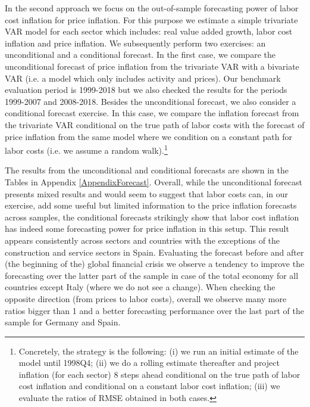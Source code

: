 \documentclass[11pt]{article}
\begin{document}
In the second approach we focus on the out-of-sample forecasting power of labor cost inflation for price inflation. For this purpose we estimate a simple trivariate VAR model for each sector which includes: real value added growth, labor cost inflation and price inflation. We subsequently perform two exercises: an unconditional and a conditional forecast. In the first case, we compare the unconditional forecast of price inflation from the trivariate VAR with a bivariate VAR (i.e. a model which only includes activity and prices). Our benchmark evaluation period is 1999-2018 but we also checked the results for the periods 1999-2007 and 2008-2018.  Besides the unconditional forecast, we also consider a conditional forecast exercise. In this case, we compare the inflation forecast from the trivariate VAR conditional on the true path of labor costs with the forecast of price inflation from the same model where we condition on a constant path for labor costs (i.e. we assume a random walk).\footnote{Concretely, the strategy is the following: (i) we run an initial estimate of the model until 1998Q4; (ii) we do a rolling estimate thereafter and project inflation (for each sector) 8 steps ahead conditional on the true path of labor cost inflation and conditional on a constant labor cost inflation; (iii) we evaluate the ratios of RMSE obtained in both cases.}

The results from the unconditional and conditional forecasts are shown in the Tables in Appendix \ref{AppendixForecast}. Overall, while the unconditional forecast presents mixed results and would seem to suggest that labor costs can, in our exercise, add some useful but limited information to the price inflation forecasts across samples, the conditional forecasts strikingly show that labor cost inflation has indeed some forecasting power for price inflation in this setup. This result appears consistently across sectors and countries with the exceptions of the construction and service sectors in Spain. Evaluating the forecast before and after (the beginning of the) global financial crisis we observe a tendency to improve the forecasting over the latter part of the sample in case of the total economy for all countries except Italy (where we do not see a change). When checking the opposite direction (from prices to labor costs), overall we observe many more ratios bigger than 1 and a better forecasting performance over the last part of the sample for Germany and Spain. 
\end{document}
